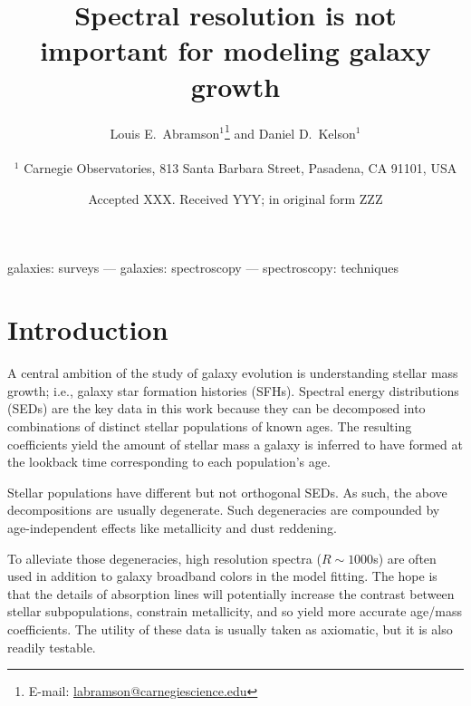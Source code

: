 \documentclass[a4paper,fleqn,usenatbib]{mnras}
\title[Who needs spectra?]{Spectral resolution is not important for modeling galaxy growth}
\author[Abramson \& Kelson]{Louis E.~Abramson$^{1}$\thanks{E-mail: \href{mailto:labramson@carnegiescience.edu}{labramson@carnegiescience.edu}} and Daniel D.~Kelson$^{1}$
\\
\\
$^1$	Carnegie Observatories, 813 Santa Barbara Street, Pasadena, CA 91101, USA\\
}
\date{Accepted XXX. Received YYY; in original form ZZZ}
\begin{document}
\label{firstpage}
\pagerange{\pageref{firstpage}--\pageref{lastpage}}
\maketitle

\begin{abstract}


\end{abstract}

\begin{keywords}
	galaxies: surveys --- galaxies: spectroscopy --- spectroscopy: techniques
\end{keywords}



\section{Introduction}
\label{sec:intro}

A central ambition of the study of galaxy evolution is understanding stellar mass growth; i.e., galaxy
star formation histories (SFHs). Spectral energy distributions (SEDs) are the key data in this work because 
they can be decomposed into combinations of distinct stellar populations of known ages. The resulting 
coefficients yield the amount of stellar mass a galaxy is inferred to have formed at the lookback time 
corresponding to each population's age.

Stellar populations have different but not orthogonal SEDs. As such, the above decompositions are 
usually degenerate. Such degeneracies are compounded by age-independent effects like metallicity and 
dust reddening. 

To alleviate those degeneracies, high resolution spectra ($R\sim1000$s) are often used in addition to 
galaxy broadband colors in the model fitting. The hope is that the details of absorption lines will potentially 
increase the contrast between stellar subpopulations, constrain metallicity, and so yield more accurate 
age/mass coefficients. The utility of these data is usually taken as axiomatic, but it is also readily testable. 
\end{document}
